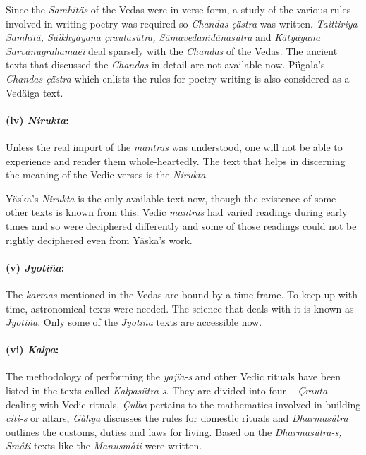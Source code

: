 Since the \textit{Samhitäs} of the Vedas were in verse form, a study of the various rules involved in writing poetry was required so \textit{Chandas çästra} was written. \textit{Taittiriya Samhitä, Säìkhyäyana çrautasütra, Sämavedanidänasütra} and \textit{Kätyäyana Sarvänugrahamaëi} deal sparsely with the \textit{Chandas} of the Vedas. The ancient texts that discussed the \textit{Chandas} in detail are not available now. Piìgala’s \textit{Chandas çästra} which enlists the rules for poetry writing is also considered as a Vedäìga text.


\paragraph*{(iv) \textit{Nirukta}:}

Unless the real import of the \textit{mantras} was understood, one will not be able to experience and render them whole-heartedly. The text that helps in discerning the meaning of the Vedic verses is the \textit{Nirukta}.

Yäska’s \textit{Nirukta} is the only available text now, though the existence of some other texts is known from this. Vedic \textit{mantras} had varied readings during early times and so were deciphered differently and some of those readings could not be rightly deciphered even from Yäska’s work.


\paragraph*{(v) \textit{Jyotiña}:}

The \textit{karmas} mentioned in the Vedas are bound by a time-frame. To keep up with time, astronomical texts were needed. The science that deals with it is known as \textit{Jyotiña}. Only some of the \textit{Jyotiña} texts are accessible now.


\paragraph*{(vi) \textit{Kalpa}:}

The methodology of performing the \textit{yajïa-s} and other Vedic rituals have been listed in the texts called \textit{Kalpasütra-s}. They are divided into four – \textit{Çrauta} dealing with Vedic rituals, \textit{Çulba} pertains to the mathematics involved in building \textit{citi-s} or altars, \textit{ Gåhya} discusses the rules for domestic rituals and \textit{Dharmasütra} outlines the customs, duties and laws for living. Based on the \textit{Dharmasütra-s, Småti} texts like the \textit{Manusmåti} were written.


